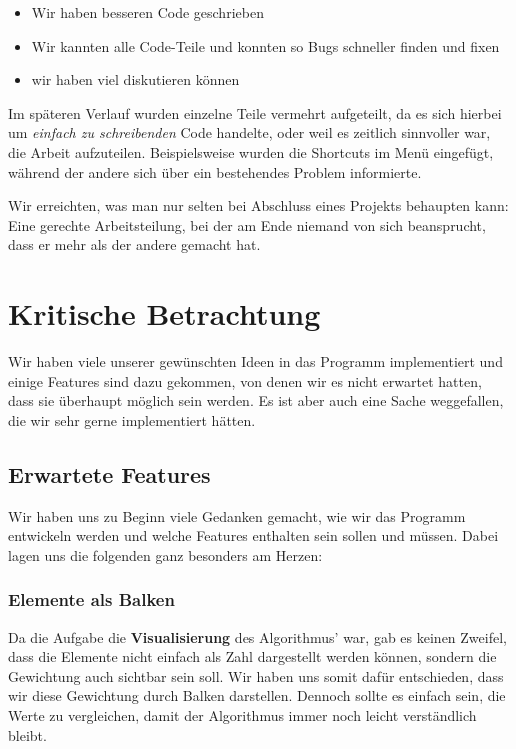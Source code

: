 \begin{itemize}
\item Wir haben besseren Code geschrieben
\item Wir kannten alle Code-Teile und konnten so Bugs schneller finden und fixen
\item wir haben viel diskutieren können
\end{itemize}

Im späteren Verlauf wurden einzelne Teile vermehrt aufgeteilt, da es sich hierbei um \textit{einfach zu schreibenden} Code handelte, oder weil es zeitlich sinnvoller war, die Arbeit aufzuteilen. Beispielsweise wurden die Shortcuts im Menü eingefügt, während der andere sich über ein bestehendes Problem informierte.

Wir erreichten, was man nur selten bei Abschluss eines Projekts behaupten kann: Eine gerechte Arbeitsteilung, bei der am Ende niemand von sich beansprucht, dass er mehr als der andere gemacht hat.
\section{Kritische Betrachtung}\label{sec:kritische-betrachtung}
Wir haben viele unserer gewünschten Ideen in das Programm implementiert und einige Features sind dazu gekommen, von denen wir es nicht erwartet hatten, dass sie überhaupt möglich sein werden. Es ist aber auch eine Sache weggefallen, die wir sehr gerne implementiert hätten.

\subsection{Erwartete Features}
Wir haben uns zu Beginn viele Gedanken gemacht, wie wir das Programm entwickeln werden und welche Features enthalten sein sollen und müssen. Dabei lagen uns die folgenden ganz besonders am Herzen:

\subsubsection{Elemente als Balken}
Da die Aufgabe die \textbf{Visualisierung} des Algorithmus' war, gab es keinen Zweifel, dass die Elemente nicht einfach als Zahl dargestellt werden können, sondern die Gewichtung auch sichtbar sein soll. Wir haben uns somit dafür entschieden, dass wir diese Gewichtung durch Balken darstellen. Dennoch sollte es einfach sein, die Werte zu vergleichen, damit der Algorithmus immer noch leicht verständlich bleibt.

